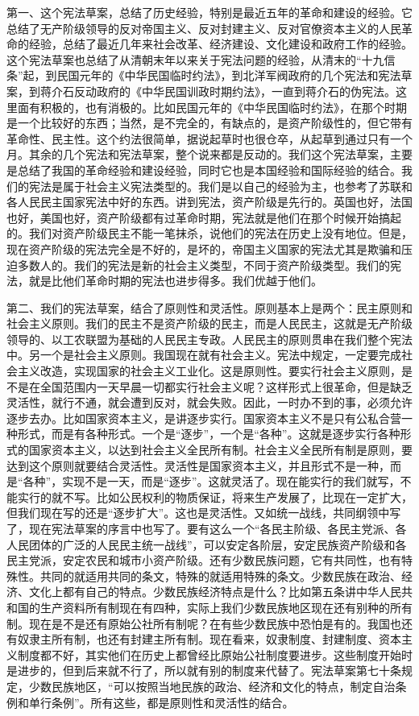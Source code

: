 第一、这个宪法草案，总结了历史经验，特别是最近五年的革命和建设的经验。它总结了无产阶级领导的反对帝国主义、反对封建主义、反对官僚资本主义的人民革命的经验，总结了最近几年来社会改革、经济建设、文化建设和政府工作的经验。这个宪法草案也总结了从清朝末年以来关于宪法问题的经验，从清末的“十九信条”起，到民国元年的《中华民国临时约法》，到北洋军阀政府的几个宪法和宪法草案，到蒋介石反动政府的《中华民国训政时期约法》，一直到蒋介石的伪宪法。这里面有积极的，也有消极的。比如民国元年的《中华民国临时约法》，在那个时期是一个比较好的东西；当然，是不完全的，有缺点的，是资产阶级性的，但它带有革命性、民主性。这个约法很简单，据说起草时也很仓卒，从起草到通过只有一个月。其余的几个宪法和宪法草案，整个说来都是反动的。我们这个宪法草案，主要是总结了我国的革命经验和建设经验，同时它也是本国经验和国际经验的结合。我们的宪法是属于社会主义宪法类型的。我们是以自己的经验为主，也参考了苏联和各人民民主国家宪法中好的东西。讲到宪法，资产阶级是先行的。英国也好，法国也好，美国也好，资产阶级都有过革命时期，宪法就是他们在那个时候开始搞起的。我们对资产阶级民主不能一笔抹杀，说他们的宪法在历史上没有地位。但是，现在资产阶级的宪法完全是不好的，是坏的，帝国主义国家的宪法尤其是欺骗和压迫多数人的。我们的宪法是新的社会主义类型，不同于资产阶级类型。我们的宪法，就是比他们革命时期的宪法也进步得多。我们优越于他们。

第二、我们的宪法草案，结合了原则性和灵活性。原则基本上是两个：民主原则和社会主义原则。我们的民主不是资产阶级的民主，而是人民民主，这就是无产阶级领导的、以工农联盟为基础的人民民主专政。人民民主的原则贯串在我们整个宪法中。另一个是社会主义原则。我国现在就有社会主义。宪法中规定，一定要完成社会主义改造，实现国家的社会主义工业化。这是原则性。要实行社会主义原则，是不是在全国范围内一天早晨一切都实行社会主义呢？这样形式上很革命，但是缺乏灵活性，就行不通，就会遭到反对，就会失败。因此，一时办不到的事，必须允许逐步去办。比如国家资本主义，是讲逐步实行。国家资本主义不是只有公私合营一种形式，而是有各种形式。一个是“逐步”，一个是“各种”。这就是逐步实行各种形式的国家资本主义，以达到社会主义全民所有制。社会主义全民所有制是原则，要达到这个原则就要结合灵活性。灵活性是国家资本主义，并且形式不是一种，而是“各种”，实现不是一天，而是“逐步”。这就灵活了。现在能实行的我们就写，不能实行的就不写。比如公民权利的物质保证，将来生产发展了，比现在一定扩大，但我们现在写的还是“逐步扩大”。这也是灵活性。又如统一战线，共同纲领中写了，现在宪法草案的序言中也写了。要有这么一个“各民主阶级、各民主党派、各人民团体的广泛的人民民主统一战线”，可以安定各阶层，安定民族资产阶级和各民主党派，安定农民和城市小资产阶级。还有少数民族问题，它有共同性，也有特殊性。共同的就适用共同的条文，特殊的就适用特殊的条文。少数民族在政治、经济、文化上都有自己的特点。少数民族经济特点是什么？比如第五条讲中华人民共和国的生产资料所有制现在有四种，实际上我们少数民族地区现在还有别种的所有制。现在是不是还有原始公社所有制呢？在有些少数民族中恐怕是有的。我国也还有奴隶主所有制，也还有封建主所有制。现在看来，奴隶制度、封建制度、资本主义制度都不好，其实他们在历史上都曾经比原始公社制度要进步。这些制度开始时是进步的，但到后来就不行了，所以就有别的制度来代替了。宪法草案第七十条规定，少数民族地区，“可以按照当地民族的政治、经济和文化的特点，制定自治条例和单行条例”。所有这些，都是原则性和灵活性的结合。

